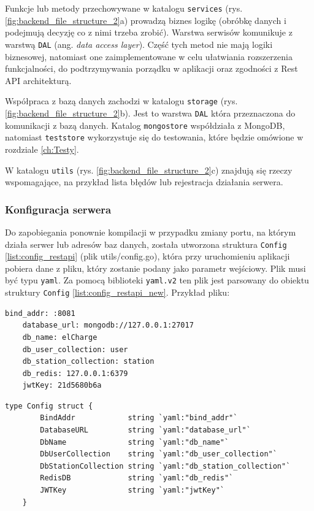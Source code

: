 Funkcje lub metody przechowywane w katalogu \texttt{services} (rys. \ref{fig:backend_file_structure_2}a) prowadzą biznes logikę (obróbkę danych i podejmują decyzję co z nimi trzeba zrobić). Warstwa serwisów komunikuje z warstwą \texttt{DAL} (ang. \textit{data access layer}). Część tych metod nie mają logiki biznesowej, natomiast one zaimplementowane w celu ułatwiania rozszerzenia funkcjalności, do podtrzymywania porządku w aplikacji oraz zgodności z Rest API architekturą.

Współpraca z bazą danych zachodzi w katalogu \texttt{storage} (rys. \ref{fig:backend_file_structure_2}b). Jest to warstwa \texttt{DAL} która przeznaczona do komunikacji z bazą danych. Katalog \texttt{mongostore} współdziała z MongoDB, natomiast \texttt{teststore} wykorzystuje się do testowania, które będzie omówione w rozdziale \ref{ch:Testy}.

W katalogu \texttt{utils} (rys. \ref{fig:backend_file_structure_2}c) znajdują się rzeczy wspomagające, na przykład lista błędów lub rejestracja działania serwera.

\subsubsection{Konfiguracja serwera}
Do zapobiegania ponownie kompilacji w przypadku zmiany portu, na którym działa serwer lub adresów baz danych, została utworzona struktura \texttt{Config} \ref{list:config_restapi} (plik utils/config.go), która przy uruchomieniu aplikacji pobiera dane z pliku, który zostanie podany jako parametr wejściowy.
Plik musi być typu \texttt{yaml}. Za pomocą biblioteki \texttt{yaml.v2} ten plik jest parsowany do obiektu struktury \texttt{Config} \ref{list:config_restapi_new}. Przykład pliku:\begin{lstlisting}[basicstyle=\tiny\ttfamily]
    bind_addr: :8081
    database_url: mongodb://127.0.0.1:27017
    db_name: elCharge
    db_user_collection: user
    db_station_collection: station
    db_redis: 127.0.0.1:6379
    jwtKey: 21d5680b6a
\end{lstlisting}

\begin{lstlisting}[label=list:config_restapi,caption=Klasa konfiguracyjna części serwerowej,basicstyle=\tiny\ttfamily]
    type Config struct {
        BindAddr            string `yaml:"bind_addr"`
        DatabaseURL         string `yaml:"database_url"`
        DbName              string `yaml:"db_name"`
        DbUserCollection    string `yaml:"db_user_collection"`
        DbStationCollection string `yaml:"db_station_collection"`
        RedisDB             string `yaml:"db_redis"`
        JWTKey              string `yaml:"jwtKey"`
    }
\end{lstlisting}

